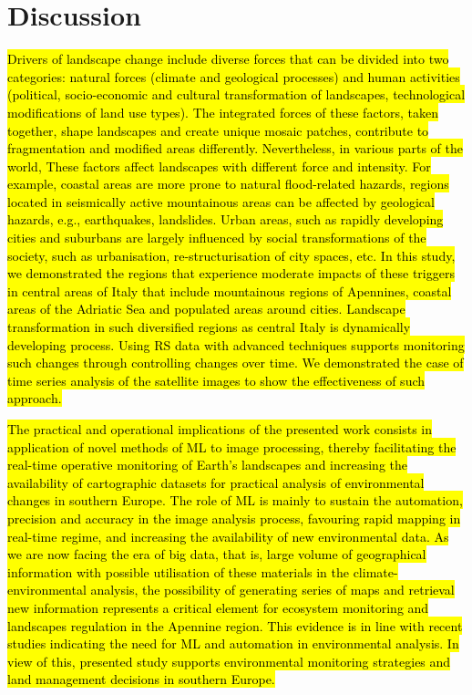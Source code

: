 \documentclass[jimaging,article,submit,pdftex,moreauthors]{Definitions/mdpi}
\begin{document}
\section{Discussion}

\hl{Drivers of landscape change include diverse forces that can be divided into two categories: natural forces (climate and geological processes) and human activities (political, socio-economic and cultural transformation of landscapes, technological modifications of land use types). The integrated forces of these factors, taken together, shape landscapes and create unique mosaic patches, contribute to fragmentation and modified areas differently. Nevertheless, in various parts of the world, These factors affect landscapes with different force and intensity. For example, coastal areas are more prone to natural flood-related hazards, regions located in seismically active mountainous areas can be affected by geological hazards, e.g., earthquakes, landslides. Urban areas, such as rapidly developing cities and suburbans are largely influenced by social transformations of the society, such as urbanisation, re-structurisation of city spaces, etc. In this study, we demonstrated the regions that experience moderate impacts of these triggers in central areas of Italy that include mountainous regions of Apennines, coastal areas of the Adriatic Sea and populated areas around cities. Landscape transformation in such diversified regions as central Italy is dynamically developing process. Using RS data with advanced techniques supports monitoring such changes through controlling changes over time. We demonstrated the case of time series analysis of the satellite images to show the effectiveness of such approach. }

\hl{The practical and operational implications of the presented work consists in application of novel methods of ML to image processing, thereby facilitating the real-time operative monitoring of Earth's landscapes and increasing the availability of cartographic datasets for practical analysis of environmental changes in southern Europe. The role of ML is mainly to sustain the automation, precision and accuracy in the image analysis process, favouring rapid mapping in real-time regime, and increasing the availability of new environmental data. As we are now facing the era of big data, that is, large volume of geographical information with possible utilisation of these materials in the climate-environmental analysis, the possibility of generating series of maps and retrieval new information  represents a critical element for ecosystem monitoring and landscapes regulation in the Apennine region. This evidence is in line with recent studies indicating the need for ML and automation in environmental analysis. In view of this, presented study supports environmental monitoring strategies and land management decisions in southern Europe. }
\end{document}
